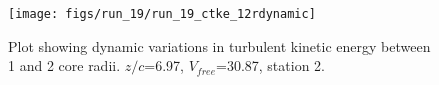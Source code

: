 \begin{figure}[H]
\centering
\texttt{[image: figs/run\_19/run\_19\_ctke\_12rdynamic]}
\caption{Plot showing dynamic variations in turbulent kinetic energy between 1 and 2 core radii. $z/c$=6.97, $V_{free}$=30.87, station 2.}
\label{fig:run_19_ctke_12rdynamic}
\end{figure}


